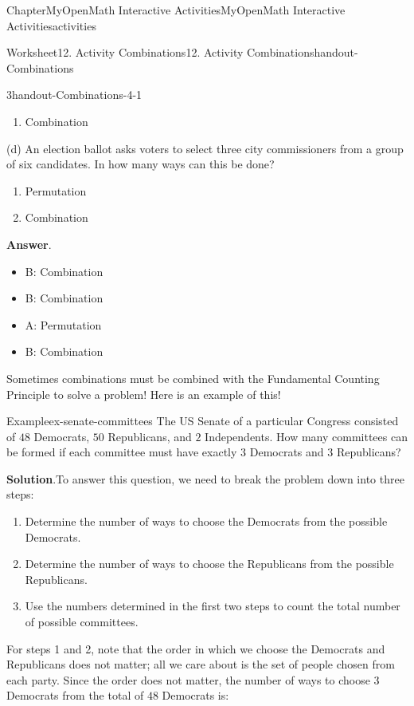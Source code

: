 \documentclass[oneside,10pt,]{book}
\newcommand{\blocktitlefont}{\relax}
\newcommand{\ptxlistdisc}{\raisebox{0.3ex}{\textbullet}}
\begin{document}
\begin{chapterptx}{Chapter}{MyOpenMath Interactive Activities}{}{MyOpenMath Interactive Activities}{}{}{activities}
\begin{worksheet-section}{Worksheet}{12. Activity Combinations}{}{12. Activity Combinations}{}{}{handout-Combinations}
\begin{divisionexercise}{3}{}{}{handout-Combinations-4-1}
\begin{enumerate}[label={(\alph*)}]
\item{}Combination%
\end{enumerate}
%
\par
(d)  An election ballot asks voters to select three city commissioners from a group of six candidates. In how many ways can this be done?%
\par
%
\begin{enumerate}[label={(\alph*)}]
\item{}Permutation%
\item{}Combination%
\end{enumerate}
%
\par\smallskip%
\noindent\textbf{\blocktitlefont Answer}.\hypertarget{handout-Combinations-4-1-2}{}\quad{}%
\begin{itemize}[label=\ptxlistdisc]
\item{}B: Combination%
\item{}B: Combination%
\item{}A: Permutation%
\item{}B: Combination%
\end{itemize}
%
\end{divisionexercise}%
\clearpage
Sometimes combinations must be combined with the Fundamental Counting Principle to solve a problem! Here is an example of this!%
\begin{example}{Example}{}{ex-senate-committees}%
The US Senate of a particular Congress consisted of \(48\) Democrats, \(50\) Republicans, and \(2\) Independents. How many committees can be formed if each committee must have exactly \(3\) Democrats and \(3\) Republicans?%
\par\smallskip%
\noindent\textbf{\blocktitlefont Solution}.\hypertarget{ex-senate-committees-2}{}\quad{}To answer this question, we need to break the problem down into three steps:%
\begin{enumerate}[label={(\alph*)}]
\item{}Determine the number of ways to choose the Democrats from the possible Democrats.%
\item{}Determine the number of ways to choose the Republicans from the possible Republicans.%
\item{}Use the numbers determined in the first two steps to count the total number of possible committees.%
\end{enumerate}
%
\par
For steps 1 and 2, note that the order in which we choose the Democrats and Republicans does not matter; all we care about is the set of people chosen from each party. Since the order does not matter, the number of ways to choose \(3\) Democrats from the total of \(48\) Democrats is:%

\end{example}
\end{worksheet-section}
\end{chapterptx}
\end{document}
